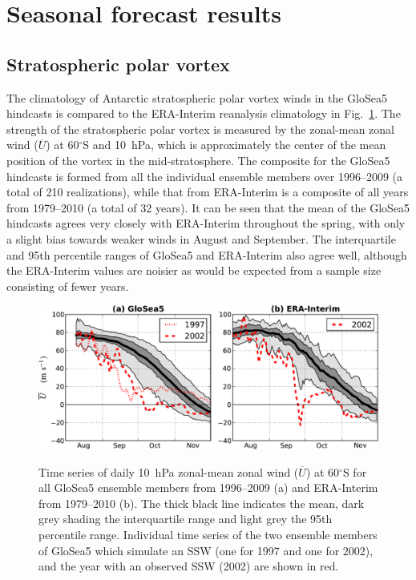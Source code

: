 \section{Seasonal forecast results}

\subsection{Stratospheric polar vortex}

The climatology of Antarctic stratospheric polar vortex winds in the GloSea5
hindcasts is compared to the ERA-Interim reanalysis climatology in Fig.\
\ref{fig:sh_zmzw_clim}. The strength of the stratospheric polar vortex is
measured by the zonal-mean zonal wind ($\overline{U}$) at 60$^{\circ}$S and
10~hPa, which is approximately the center of the mean position of the vortex in
the mid-stratosphere. The composite for the GloSea5 hindcasts is formed from all
the individual ensemble members over 1996--2009 (a total of 210 realizations),
while that from ERA-Interim is a composite of all years from 1979--2010 (a total
of 32 years). It can be seen that the mean of the GloSea5 hindcasts agrees very
closely with ERA-Interim throughout the spring, with only a slight bias towards
weaker winds in August and September. The interquartile and 95th percentile
ranges of GloSea5 and ERA-Interim also agree well, although the ERA-Interim
values are noisier as would be expected from a sample size consisting of fewer
years.

\begin{figure}[t]
  \noindent\includegraphics[width=\textwidth,angle=0]{figures/chapter-seasonal/zmzw_climatologies_crop.pdf}\\
  \caption[Comparison of GloSea5 and ERA-Interim zonal-mean zonal wind
climatologies.]{Time series of daily 10~hPa zonal-mean zonal wind
($\overline{U}$) at 60$^{\circ}$S for all GloSea5 ensemble members from
1996--2009 (a) and ERA-Interim from 1979--2010 (b). The thick black line
indicates the mean, dark grey shading the interquartile range and light grey the
95th percentile range. Individual time series of the two ensemble members of
GloSea5 which simulate an SSW (one for 1997 and one for 2002), and the year with
an observed SSW (2002) are shown in red.}\label{fig:sh_zmzw_clim}
\end{figure}

